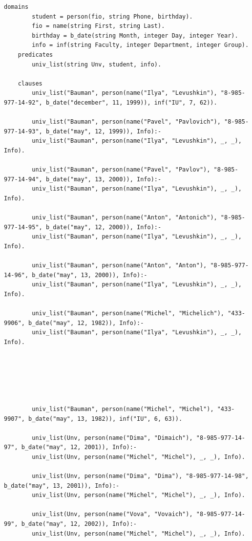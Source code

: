 \documentclass[a4paper,12pt]{article}
\begin{document}
	\begin{lstlisting}[label = lst0, caption = Листинг кода программы]
	domains
	    student = person(fio, string Phone, birthday).
	    fio = name(string First, string Last).
	    birthday = b_date(string Month, integer Day, integer Year).
	    info = inf(string Faculty, integer Department, integer Group).
	predicates
	    univ_list(string Unv, student, info).
	 
	clauses
	    univ_list("Bauman", person(name("Ilya", "Levushkin"), "8-985-977-14-92", b_date("december", 11, 1999)), inf("IU", 7, 62)).
	    
	    univ_list("Bauman", person(name("Pavel", "Pavlovich"), "8-985-977-14-93", b_date("may", 12, 1999)), Info):- 
	    univ_list("Bauman", person(name("Ilya", "Levushkin"), _, _), Info).
	    
	    univ_list("Bauman", person(name("Pavel", "Pavlov"), "8-985-977-14-94", b_date("may", 13, 2000)), Info):- 
	    univ_list("Bauman", person(name("Ilya", "Levushkin"), _, _), Info).
	    
	    univ_list("Bauman", person(name("Anton", "Antonich"), "8-985-977-14-95", b_date("may", 12, 2000)), Info):- 
	    univ_list("Bauman", person(name("Ilya", "Levushkin"), _, _), Info).
	    
	    univ_list("Bauman", person(name("Anton", "Anton"), "8-985-977-14-96", b_date("may", 13, 2000)), Info):- 
	    univ_list("Bauman", person(name("Ilya", "Levushkin"), _, _), Info).
	    
	    univ_list("Bauman", person(name("Michel", "Michelich"), "433-9906", b_date("may", 12, 1982)), Info):- 
	    univ_list("Bauman", person(name("Ilya", "Levushkin"), _, _), Info).
	    
	    
	    
	    
	    
	    
	    univ_list("Bauman", person(name("Michel", "Michel"), "433-9907", b_date("may", 13, 1982)), inf("IU", 6, 63)).
	    
	    univ_list(Unv, person(name("Dima", "Dimaich"), "8-985-977-14-97", b_date("may", 12, 2001)), Info):-
	    univ_list(Unv, person(name("Michel", "Michel"), _, _), Info).
	    
	    univ_list(Unv, person(name("Dima", "Dima"), "8-985-977-14-98", b_date("may", 13, 2001)), Info):-
	    univ_list(Unv, person(name("Michel", "Michel"), _, _), Info).
	    
	    univ_list(Unv, person(name("Vova", "Vovaich"), "8-985-977-14-99", b_date("may", 12, 2002)), Info):-
	    univ_list(Unv, person(name("Michel", "Michel"), _, _), Info).
	    

\end{lstlisting}
\end{document}
